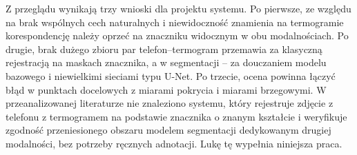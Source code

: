Z przeglądu wynikają trzy wnioski dla projektu systemu. Po pierwsze, ze względu na brak wspólnych cech naturalnych i niewidoczność znamienia na termogramie korespondencję należy oprzeć na znaczniku widocznym w obu modalnościach. Po drugie, brak dużego zbioru par telefon--termogram przemawia za klasyczną rejestracją na maskach znacznika, a w segmentacji -- za douczaniem modelu bazowego i niewielkimi sieciami typu U-Net. Po trzecie, ocena powinna łączyć błąd w punktach docelowych z miarami pokrycia i miarami brzegowymi. W przeanalizowanej literaturze nie znaleziono systemu, który rejestruje zdjęcie z telefonu z termogramem na podstawie znacznika o znanym kształcie i weryfikuje zgodność przeniesionego obszaru modelem segmentacji dedykowanym drugiej modalności, bez potrzeby ręcznych adnotacji. Lukę tę wypełnia niniejsza praca.

